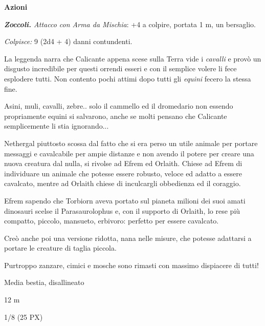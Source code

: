 \begin{multicols}{2}
{\textbf{Azioni}

\emph{\textbf{Zoccoli.} Attacco con Arma da Mischia}: +4 a colpire, portata 1 m, un bersaglio.

\emph{Colpisce:} 9 (2d4 + 4) danni contundenti.


\begin{giocatore}[Il Saurovallo]
La leggenda narra che Calicante appena scese sulla Terra vide i \emph{cavalli} e provò un disgusto incredibile per questi orrendi esseri e con il semplice volere li fece esplodere tutti. Non contento pochi attimi dopo tutti gli \emph{equini} fecero la stessa fine.

Asini, muli, cavalli, zebre.. solo il cammello ed il dromedario non essendo propriamente equini si salvarono, anche se molti pensano che Calicante semplicemente li stia ignorando...

Nethergal piuttosto scossa dal fatto che si era perso un utile animale per portare messaggi e cavalcabile per ampie distanze e non avendo il potere per creare una nuova creatura dal nulla, si rivolse ad Efrem ed Orlaith. Chiese ad Efrem di individuare un animale che potesse essere robusto, veloce ed adatto a essere cavalcato, mentre ad Orlaith chiese di inculcargli obbedienza ed il coraggio.

Efrem sapendo che Torbiorn aveva portato sul pianeta milioni dei suoi amati dinosauri scelse il Parasaurolophus e, con il supporto di Orlaith, lo rese più compatto, piccolo, mansueto, erbivoro: perfetto per essere cavalcato.

Creò anche poi una versione ridotta, nana nelle misure, che potesse adattarsi a portare le creature di taglia piccola.

Purtroppo zanzare, cimici e mosche sono rimasti con massimo dispiacere di tutti!
\end{giocatore}

\begin{description}[noitemsep, topsep=0pt, parsep=0pt, partopsep=0pt, itemsep=1pt, leftmargin=2.35cm,  labelwidth=2.2cm, itemindent=0cm, listparindent=0pt] %
\setlength{\baselineskip}{10pt}
\item[\textbf{Taglia/Tipo}] Media bestia, disallineato
\item[\textbf{Caratt.}] 
\item[\textbf{Punti Ferita}] 
\item[\textbf{Tiri Salvez.}] 
\item[\textbf{Movimento}] 12 m
\item[\textbf{Sfida}] 1/8 (25 PX)
\end{description}
\smallskip

}
\end{multicols}
